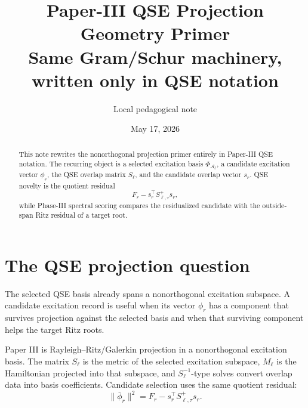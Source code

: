 \documentclass[10pt,twocolumn]{article}
\title{Paper-III QSE Projection Geometry Primer\\[-1mm]
\large Same Gram/Schur machinery, written only in QSE notation}
\author{Local pedagogical note}
\date{May 17, 2026}
\begin{document}
\maketitle

\begin{abstract}
This note rewrites the nonorthogonal projection primer entirely in Paper-III QSE notation. The recurring object is a selected excitation basis \(\Phi_{\mathcal A_\ell}\), a candidate excitation vector \(\phi_r\), the QSE overlap matrix \(S_\ell\), and the candidate overlap vector \(s_r\). QSE novelty is the quotient residual
\[
F_r-s_r^\top S_{\ell,\tau}^+s_r,
\]
while Phase-III spectral scoring compares the residualized candidate with the outside-span Ritz residual of a target root.
\end{abstract}

\section{The QSE projection question}

\begin{intuitionbox}
The selected QSE basis already spans a nonorthogonal excitation subspace. A candidate excitation record is useful when its vector \(\phi_r\) has a component that survives projection against the selected basis and when that surviving component helps the target Ritz roots.
\end{intuitionbox}

\begin{jargonbox}
Paper III is Rayleigh--Ritz/Galerkin projection in a nonorthogonal excitation basis. The matrix \(S_\ell\) is the metric of the selected excitation subspace, \(M_\ell\) is the Hamiltonian projected into that subspace, and \(S_\ell^{-1}\)-type solves convert overlap data into basis coefficients. Candidate selection uses the same quotient residual:
\[
\|\bar\phi_r\|^2=F_r-s_r^\top S_{\ell,\tau}^+s_r.
\]
\end{jargonbox}
\end{document}

